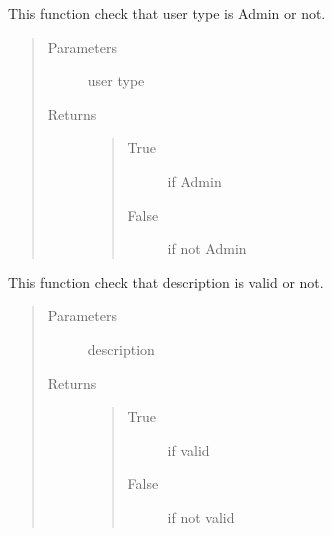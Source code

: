 \documentclass[letterpaper,10pt,english]{sphinxmanual}
\begin{document}

\begin{fulllineitems}
\label{\detokenize{janta:janta.viewhelper.is_admin}}
This function check that user type is Admin or not.
\begin{quote}\begin{description}
\item[{Parameters}] \leavevmode
{} \textendash{} user type

\item[{Returns}] \leavevmode
\begin{quote}\begin{description}
\item[{True}] \leavevmode
if Admin

\item[{False}] \leavevmode
if not Admin

\end{description}\end{quote}


\end{description}\end{quote}

\end{fulllineitems}


\begin{fulllineitems}
\label{\detokenize{janta:janta.viewhelper.is_description}}
This function check that description is valid or not.
\begin{quote}\begin{description}
\item[{Parameters}] \leavevmode
{} \textendash{} description

\item[{Returns}] \leavevmode
\begin{quote}\begin{description}
\item[{True}] \leavevmode
if valid

\item[{False}] \leavevmode
if not valid

\end{description}\end{quote}


\end{description}\end{quote}

\end{fulllineitems}
\end{document}
